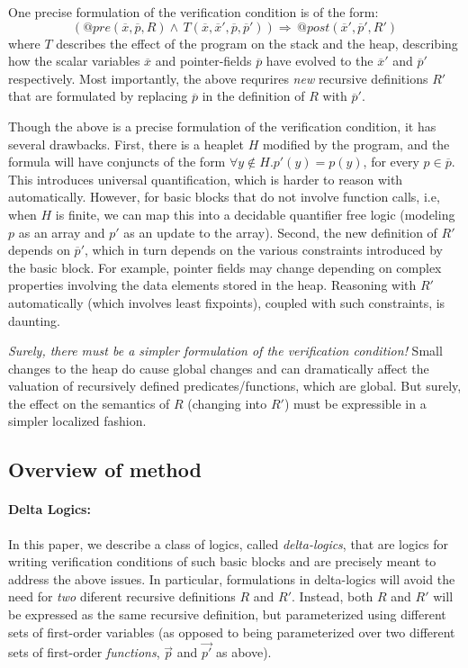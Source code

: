 \documentclass[acmsmall,review,anonymous]{acmart}\settopmatter{printfolios=true,printccs=false,printacmref=false}
\newcommand{\vect}[1]{\overline{#1}}
\begin{document}
One precise formulation of the verification condition is of the form:
$$\left(\textit{@pre}(\vect{x}, \vect{p}, R) \wedge\, T(\vect{x}, \vect{x}', \vect{p}, \vect{p}')\right) \Rightarrow\, \textit{@post}(\vect{x}', \vect{p}', R')$$
where $T$ describes the effect of the program on the stack and the heap, describing how the scalar variables $\vect{x}$ and pointer-fields $\vect{p}$ have evolved to the $\vect{x}'$ and $\vect{p}'$ respectively. Most importantly, the above requrires \emph{new} recursive definitions $R'$ that are formulated by replacing $\vect{p}$ in the definition of $R$ with $\vect{p}'$. 

Though the above is a precise formulation of the verification condition, it has several drawbacks. First, there is a heaplet $H$
modified by the program, and the formula will have conjuncts of the form $\forall y \not \in H. p'(y)=p(y)$, for every $p \in \vect{p}$. This introduces
universal quantification, which is harder to reason with automatically. However, for basic blocks that do not involve
function calls, i.e, when $H$ is finite, we can map this into a decidable quantifier free logic (modeling $p$ as an array
and $p'$ as an update to the array).
Second, the new definition of $R'$ depends on $\vect{p}'$, which in turn depends on the various constraints introduced by the basic
block. For example, pointer fields may change depending on complex properties involving the data elements stored in the heap.
Reasoning with $R'$ automatically (which involves least fixpoints), coupled with such constraints, is daunting.

\emph{Surely, there must be a simpler formulation of the verification condition!} Small changes to the heap do cause global changes and
can dramatically affect the valuation of recursively defined predicates/functions, which are global.
But surely, the effect on the semantics of $R$ (changing into $R'$) must be expressible in a simpler localized fashion.


\subsection{Overview of method}

\paragraph{Delta Logics:}
In this paper, we describe a class of logics, called \emph{delta-logics}, that are logics for writing verification conditions of such basic blocks and are precisely meant to address the above issues. In particular, formulations in delta-logics will avoid the need for \emph{two} diferent recursive definitions $R$ and $R'$.
Instead, both $R$ and $R'$ will be expressed as the same recursive definition, but parameterized using different sets of first-order variables
(as opposed to being parameterized over two different sets of first-order \emph{functions}, $\vec{p}$ and $\vec{p'}$ as above).
\end{document}

